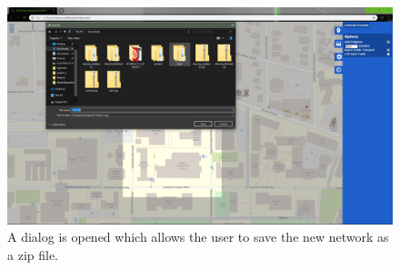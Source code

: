 \documentclass[letterpaper, 10pt, onecolumn, draftclsnofoot]{IEEEtran}
\begin{document}
\vspace{3pt}
\begin{figure}[h!]
    \includegraphics[width=\textwidth]{OsmDownloadZip_8}
    \caption{A dialog is opened which allows the user to save the new network as a zip file.}
    \label{fig:my_label}
\end{figure}
    
\end{document}
